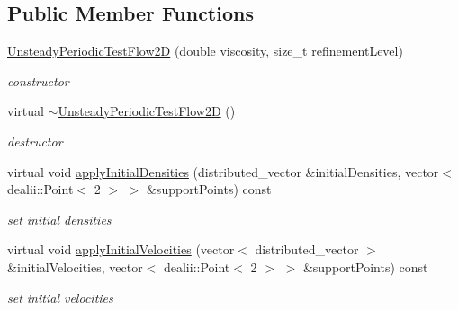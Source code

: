 \subsection*{Public Member Functions}
\begin{DoxyCompactItemize}
\item 
\hypertarget{classnatrium_1_1UnsteadyPeriodicTestFlow2D_a3a513d06c9018e78041cf8179ef2d80f}{\hyperlink{classnatrium_1_1UnsteadyPeriodicTestFlow2D_a3a513d06c9018e78041cf8179ef2d80f}{Unsteady\-Periodic\-Test\-Flow2\-D} (double viscosity, size\-\_\-t refinement\-Level)}\label{classnatrium_1_1UnsteadyPeriodicTestFlow2D_a3a513d06c9018e78041cf8179ef2d80f}

\begin{DoxyCompactList}\small\item\em constructor \end{DoxyCompactList}\item 
\hypertarget{classnatrium_1_1UnsteadyPeriodicTestFlow2D_aa91ea175e2993bf00f8a48fded987c54}{virtual \hyperlink{classnatrium_1_1UnsteadyPeriodicTestFlow2D_aa91ea175e2993bf00f8a48fded987c54}{$\sim$\-Unsteady\-Periodic\-Test\-Flow2\-D} ()}\label{classnatrium_1_1UnsteadyPeriodicTestFlow2D_aa91ea175e2993bf00f8a48fded987c54}

\begin{DoxyCompactList}\small\item\em destructor \end{DoxyCompactList}\item 
virtual void \hyperlink{classnatrium_1_1UnsteadyPeriodicTestFlow2D_a2f97a5892be99659dd9aab135940dc01}{apply\-Initial\-Densities} (distributed\-\_\-vector \&initial\-Densities, vector$<$ dealii\-::\-Point$<$ 2 $>$ $>$ \&support\-Points) const 
\begin{DoxyCompactList}\small\item\em set initial densities \end{DoxyCompactList}\item 
virtual void \hyperlink{classnatrium_1_1UnsteadyPeriodicTestFlow2D_a5ce050cdce0898f42e3bdfa9326f2349}{apply\-Initial\-Velocities} (vector$<$ distributed\-\_\-vector $>$ \&initial\-Velocities, vector$<$ dealii\-::\-Point$<$ 2 $>$ $>$ \&support\-Points) const 
\begin{DoxyCompactList}\small\item\em set initial velocities \end{DoxyCompactList}\end{DoxyCompactItemize}


